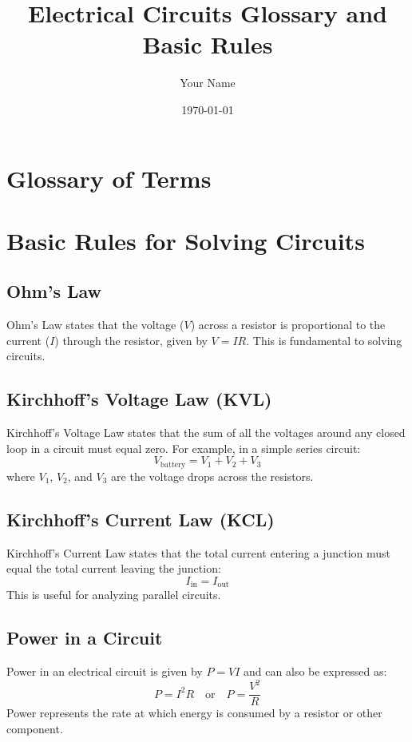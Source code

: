 \documentclass{article}
\begin{document}
\title{Electrical Circuits Glossary and Basic Rules}
\author{Your Name}
\date{\today}
\maketitle

\section*{Glossary of Terms}

\printglossaries

\section*{Basic Rules for Solving Circuits}

\subsection*{Ohm's Law}
Ohm's Law states that the voltage (\(V\)) across a resistor is proportional to the current (\(I\)) through the resistor, given by \(V = IR\). This is fundamental to solving circuits.

\subsection*{Kirchhoff's Voltage Law (KVL)}
Kirchhoff's Voltage Law states that the sum of all the voltages around any closed loop in a circuit must equal zero. For example, in a simple series circuit:
\[
V_{\text{battery}} = V_1 + V_2 + V_3
\]
where \(V_1\), \(V_2\), and \(V_3\) are the voltage drops across the resistors.

\subsection*{Kirchhoff's Current Law (KCL)}
Kirchhoff's Current Law states that the total current entering a junction must equal the total current leaving the junction:
\[
I_{\text{in}} = I_{\text{out}}
\]
This is useful for analyzing parallel circuits.

\subsection*{Power in a Circuit}
Power in an electrical circuit is given by \(P = VI\) and can also be expressed as:
\[
P = I^2 R \quad \text{or} \quad P = \frac{V^2}{R}
\]
Power represents the rate at which energy is consumed by a resistor or other component.
\end{document}
